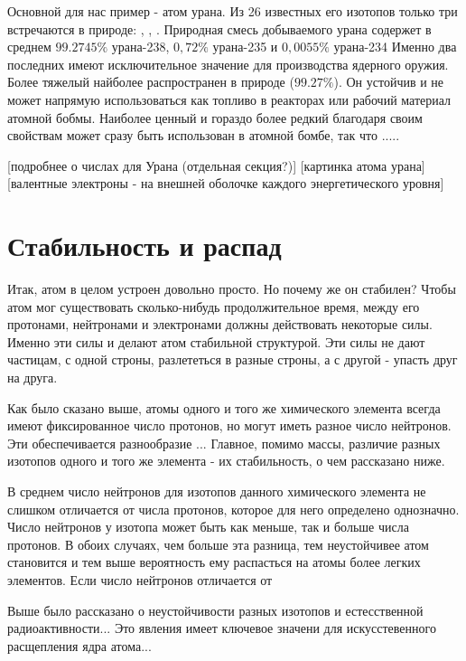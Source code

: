 Основной для нас пример - атом урана.
Из 26 известных его изотопов только три встречаются в природе: , , .
Природная смесь добываемого урана содержет в среднем $99.2745\%$ урана-238, $0,72\%$ урана-235 и $0,0055\%$ урана-234
Именно два последних имеют исключительное значение для производства ядерного оружия.
Более тяжелый  найболее распространен в природе ($99.27\%$).
Он устойчив и не может напрямую использоваться как топливо в реакторах или рабочий материал атомной бобмы.
Наиболее ценный и гораздо более редкий  благодаря своим свойствам может сразу быть использован в атомной бомбе, так что .....  

[подробнее о числах для Урана (отдельная секция?)]
[картинка атома урана]
[валентные электроны - на внешней оболочке каждого энергетического уровня]


\section*{Стабильность и распад}

Итак, атом в целом устроен довольно просто.
Но почему же он стабилен?
Чтобы атом мог существовать сколько-нибудь продолжительное время, между его протонами, нейтронами и электронами должны действовать некоторые силы.
Именно эти силы и делают атом стабильной структурой.
Эти силы не дают частицам, с одной строны, разлететься в разные строны, а с другой - упасть друг на друга.



Как было сказано выше, атомы одного и того же химического элемента всегда имеют фиксированное число протонов, но могут иметь разное число нейтронов. 
Эти обеспечивается разнообразие ...
Главное, помимо массы, различие разных изотопов одного и того же элемента - их стабильность, о чем рассказано ниже.



В среднем число нейтронов для изотопов данного химического элемента не слишком отличается от числа протонов, которое для него определено однозначно.
Число нейтронов у изотопа может быть как меньше, так и больше числа протонов.
В обоих случаях, чем больше эта разница, тем неустойчивее атом становится и тем выше вероятность ему распасться на атомы более легких элементов.
Если число нейтронов отличается от 

Выше было рассказано о неустойчивости разных изотопов и естесственной радиоактивности...
Это явления имеет ключевое значени для искусстевенного расщепления ядра атома...



